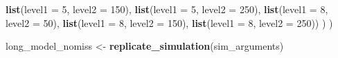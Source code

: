 \documentclass[man]{apa6}
\newenvironment{Shaded}{\begin{snugshade}}{\end{snugshade}}
\newcommand{\DataTypeTok}[1]{\textcolor[rgb]{0.13,0.29,0.53}{#1}}
\newcommand{\DecValTok}[1]{\textcolor[rgb]{0.00,0.00,0.81}{#1}}
\newcommand{\KeywordTok}[1]{\textcolor[rgb]{0.13,0.29,0.53}{\textbf{#1}}}
\newcommand{\NormalTok}[1]{#1}
\newcommand{\OperatorTok}[1]{\textcolor[rgb]{0.81,0.36,0.00}{\textbf{#1}}}
\newcommand{\OtherTok}[1]{\textcolor[rgb]{0.56,0.35,0.01}{#1}}
\newcommand{\StringTok}[1]{\textcolor[rgb]{0.31,0.60,0.02}{#1}}
\begin{document}
\begin{Shaded}
\begin{Highlighting}[]
                       \KeywordTok{list}\NormalTok{(}\DataTypeTok{level1 =} \DecValTok{5}\NormalTok{, }\DataTypeTok{level2 =} \DecValTok{150}\NormalTok{),}
                       \KeywordTok{list}\NormalTok{(}\DataTypeTok{level1 =} \DecValTok{5}\NormalTok{, }\DataTypeTok{level2 =} \DecValTok{250}\NormalTok{),}
                       \KeywordTok{list}\NormalTok{(}\DataTypeTok{level1 =} \DecValTok{8}\NormalTok{, }\DataTypeTok{level2 =} \DecValTok{50}\NormalTok{),}
                       \KeywordTok{list}\NormalTok{(}\DataTypeTok{level1 =} \DecValTok{8}\NormalTok{, }\DataTypeTok{level2 =} \DecValTok{150}\NormalTok{),}
                       \KeywordTok{list}\NormalTok{(}\DataTypeTok{level1 =} \DecValTok{8}\NormalTok{, }\DataTypeTok{level2 =} \DecValTok{250}\NormalTok{))}
\NormalTok{  )}
\NormalTok{)}

\NormalTok{long_model_nomiss <-}\StringTok{ }\KeywordTok{replicate_simulation}\NormalTok{(sim_arguments) }
\end{Highlighting}
\end{Shaded}

\begin{Shaded}
\end{Shaded}
\end{document}
